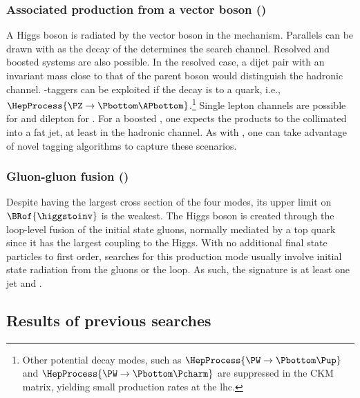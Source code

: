 

\subsubsection{Associated production from a vector boson (\texorpdfstring{\VH}{VH})}
\label{subsubsec:theory_hinv_VH_mode}

A Higgs boson is radiated by the vector boson \PVec in the \VH mechanism. Parallels can be drawn with \ttH as the decay of the \PVec determines the search channel. Resolved and boosted systems are also possible. In the resolved case, a dijet pair with an invariant mass close to that of the parent boson would distinguish the hadronic channel. \Pbottom-taggers can be exploited if the decay is to a \Pbottom quark, i.e., $\HepProcess{\PZ \to \Pbottom\APbottom}$.\footnote{Other potential decay modes, such as $\HepProcess{\PW \to \Pbottom\Pup}$ and $\HepProcess{\PW \to \Pbottom\Pcharm}$ are suppressed in the CKM matrix, yielding small production rates at the \acrshort{lhc}.} Single lepton channels are possible for \WH and dilepton for \ZH. For a boosted \PVec, one expects the products to the collimated into a fat \gls{jet}, at least in the hadronic channel. As with \ttH, one can take advantage of novel tagging algorithms to capture these scenarios. 




\subsubsection{Gluon-gluon fusion (\texorpdfstring{\ggH}{ggH})}
\label{subsubsec:theory_hinv_ggF_mode}

Despite \ggH having the largest cross section of the four modes, its upper limit on $\BRof{\higgstoinv}$ is the weakest. The Higgs boson is created through the loop-level fusion of the initial state gluons, normally mediated by a top quark since it has the largest coupling to the Higgs. With no additional final state particles to first order, searches for this production mode usually involve initial state radiation from the gluons or the loop. As such, the signature is at least one \gls{jet} and \ptmiss.




\subsection{Results of previous searches}
\label{subsec:theory_hinv_prev_results}

